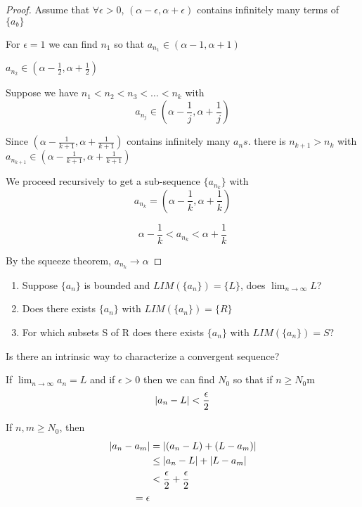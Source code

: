 \begin{proof}

Assume that $\forall \epsilon > 0$, $(\alpha - \epsilon, \alpha + \epsilon )$ contains infinitely many terms of $\{a_b\}$

For $\epsilon = 1$ we can find $n_1$ so that $a_{n_1} \in (\alpha - 1, \alpha + 1 )$

$a_{n_2} \in (\alpha - \frac{1}{2}, \alpha + \frac{1}{2} )$

Suppose we have $n_1<n_2<n_3<\dots <n_k$ with
\[
a_{n_j} \in (\alpha - \frac{1}{j} ,\alpha + \frac{1}{j})
\]

Since $(\alpha - \frac{1}{k+1} ,\alpha + \frac{1}{k+1})$ contains infinitely many $a_ns$. there is $n_{k+1}>n_k$ with $a_{n_{k+1}} \in (\alpha - \frac{1}{k+1} ,\alpha + \frac{1}{k+1})$

We proceed recursively to get a sub-sequence $\{a_{n_k}\}$ with 
\[
a_{n_k} = (\alpha - \frac{1}{k} ,\alpha + \frac{1}{k})
\]

\[
\alpha - \frac{1}{k} < a_{n_k} < \alpha + \frac{1}{k}
\]

By the squeeze theorem, $a_{n_k} \to \alpha$

\end{proof}{}


\begin{ques}
\leavevmode
\begin{enumerate}
    \item Suppose $\{a_n\}$ is bounded and $LIM(\{a_n\}) = \{L\}$, does $\lim_{n\to\infty} L$?
    \item Does there exists $\{a_n\}$ with $LIM(\{a_n\}) = \{R\}$
    \item For which subsets S of R does there exists $\{a_n\}$ with $LIM(\{a_n\}) = S$?
\end{enumerate}
\end{ques}

\begin{ques}
Is there an intrinsic way to characterize a convergent sequence?
\end{ques}

\begin{note}
If $\lim_{n\to\infty} a_n = L$ and if $\epsilon > 0$ then we can find $N_0$ so that if $n\geq N_0$m
\[
\left| a_n - L \right| < \frac{\epsilon}{2}
\]

If $n,m\geq N_0$, then
\begin{align*}
    \left| a_n - a_m \right| & = \left| (a_n - L) + (L - a_m) \right| \\
    & \leq \left| a_n - L \right| + \left| L-a_m \right| \\
    & < \frac{\epsilon}{2}+\frac{\epsilon}{2} \\
    = \epsilon
\end{align*}

\end{note}

